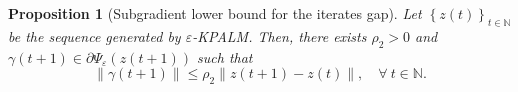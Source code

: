 \documentclass[12pt]{article}
\numberwithin{equation}{section}
\newtheorem{proposition}{Proposition}[section]
\newtheorem{lemma}{Lemma}[proposition]
\begin{document}
%

\begin{proposition}[Subgradient lower bound for the iterates gap] \label{subgrad_proof}
Let $\left\lbrace z(t) \right\rbrace_{t \in \mathbb{N}}$ be the sequence generated by $\varepsilon$-KPALM. Then, there exists $\rho_2 > 0$ and $\gamma(t+1) \in \partial \Psi_{\varepsilon}(z(t+1))$ such that 
\begin{equation*}
	\| \gamma(t+1)\| \leq \rho_2 \|z(t+1) - z(t)\|, \quad \forall \: t \in \mathbb{N} .
\end{equation*}
\end{proposition}
\end{document}
